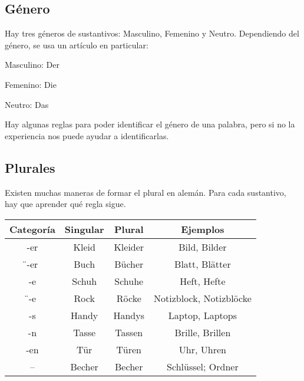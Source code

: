 \subsection{Género}
Hay tres géneros de sustantivos: Masculino, Femenino y Neutro. Dependiendo del género, se usa un artículo en particular:
\begin{myitemize}
\item Masculino: Der
\item Femenino: Die
\item Neutro: Das
\end{myitemize}
Hay algunas reglas para poder identificar el género de una palabra, pero si no la experiencia nos puede ayudar a identificarlas.

\subsection{Plurales}
Existen muchas maneras de formar el plural en alemán. Para cada sustantivo, hay que aprender qué regla sigue.

\begin{tabular}{|c | c c c|}
\hline
\textbf{Categoría} & Singular & Plural & Ejemplos\\
\hline
-er & Kleid & Kleider & Bild, Bilder \\
\"{ }-er & Buch & Bücher & Blatt, Blätter \\
-e & Schuh & Schuhe & Heft, Hefte \\
\"{ }-e & Rock & Röcke & Notizblock, Notizblöcke \\
-s & Handy & Handys & Laptop, Laptops \\
-n & Tasse & Tassen & Brille, Brillen \\
-en & Tür & Türen & Uhr, Uhren \\
-- & Becher & Becher & Schlüssel; Ordner \\
\hline
\end{tabular}

